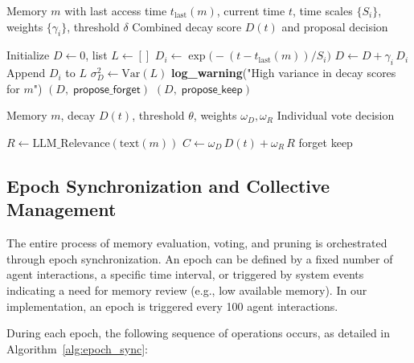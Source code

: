 \documentclass[conference]{IEEEtran}
\begin{document}
\begin{algorithm}[H]
\caption{Multi‑Scale Decay Calculation and Forgetting Proposal}
\label{alg:decay_proposal}
\begin{algorithmic}[1]
\Require Memory $m$ with last access time $t_{\text{last}}(m)$, current time $t$, time scales $\{S_i\}$, weights $\{\gamma_i\}$, threshold $\delta$
\Ensure Combined decay score $D(t)$ and proposal decision

\State Initialize $D\leftarrow 0$, list $L\leftarrow[]$
  \State $D_i \leftarrow \exp\bigl(-(t-t_{\text{last}}(m))/S_i\bigr)$
  \State $D \leftarrow D + \gamma_i\,D_i$
  \State Append $D_i$ to $L$
\EndFor
\State $\sigma_D^2 \leftarrow \mathrm{Var}(L)$
  \State \textbf{log\_warning}("High variance in decay scores for \(m\)")
\EndIf
{}
  \State \Return $(D,\;\textsf{propose\_forget})$
\Else
  \State \Return $(D,\;\textsf{propose\_keep})$
\EndIf
\end{algorithmic}
\end{algorithm}

\begin{algorithm}[H]
\caption{LLM‑Based Voting for Memory Retention}
\label{alg:llm_voting}
\begin{algorithmic}[1]
\Require Memory $m$, decay $D(t)$, threshold $\theta$, weights $\omega_D,\omega_R$
\Ensure Individual vote decision

\State $R \leftarrow \text{LLM\_Relevance}(\text{text}(m))$
\State $C \leftarrow \omega_D\,D(t) + \omega_R\,R$
  \State \Return \textsf{forget}
\Else
  \State \Return \textsf{keep}
\EndIf
\end{algorithmic}
\end{algorithm}

\subsection{Epoch Synchronization and Collective Management}

The entire process of memory evaluation, voting, and pruning is orchestrated through epoch synchronization. An epoch can be defined by a fixed number of agent interactions, a specific time interval, or triggered by system events indicating a need for memory review (e.g., low available memory). In our implementation, an epoch is triggered every 100 agent interactions.

During each epoch, the following sequence of operations occurs, as detailed in Algorithm~\ref{alg:epoch_sync}:
\end{document}
